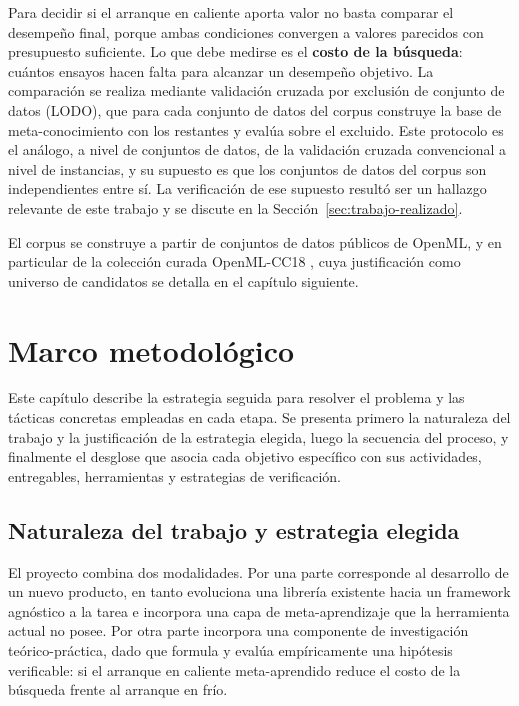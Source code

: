 \documentclass[12pt,letterpaper,oneside]{article}
\begin{document}
Para decidir si el arranque en caliente aporta valor no basta comparar el desempeño final,
porque ambas condiciones convergen a valores parecidos con presupuesto suficiente. Lo que
debe medirse es el \textbf{costo de la búsqueda}: cuántos ensayos hacen falta para
alcanzar un desempeño objetivo. La comparación se realiza mediante validación cruzada por
exclusión de conjunto de datos (LODO), que para cada conjunto de datos del corpus
construye la base de meta-conocimiento con los restantes y evalúa sobre el excluido. Este
protocolo es el análogo, a nivel de conjuntos de datos, de la validación cruzada
convencional a nivel de instancias, y su supuesto es que los conjuntos de datos del corpus
son independientes entre sí. La verificación de ese supuesto resultó ser un hallazgo
relevante de este trabajo y se discute en la Sección~\ref{sec:trabajo-realizado}.

El corpus se construye a partir de conjuntos de datos públicos de OpenML, y en particular
de la colección curada OpenML-CC18 \cite{openml-cc18}, cuya justificación como universo de
candidatos se detalla en el capítulo siguiente.

\clearpage
\section{Marco metodológico}
\label{sec:marco-metodologico}

Este capítulo describe la estrategia seguida para resolver el problema y las tácticas
concretas empleadas en cada etapa. Se presenta primero la naturaleza del trabajo y la
justificación de la estrategia elegida, luego la secuencia del proceso, y finalmente el
desglose que asocia cada objetivo específico con sus actividades, entregables,
herramientas y estrategias de verificación.

\subsection{Naturaleza del trabajo y estrategia elegida}

El proyecto combina dos modalidades. Por una parte corresponde al desarrollo de un nuevo
producto, en tanto evoluciona una librería existente hacia un framework agnóstico a la
tarea e incorpora una capa de meta-aprendizaje que la herramienta actual no posee. Por
otra parte incorpora una componente de investigación teórico-práctica, dado que formula y
evalúa empíricamente una hipótesis verificable: si el arranque en caliente meta-aprendido
reduce el costo de la búsqueda frente al arranque en frío.
\end{document}
